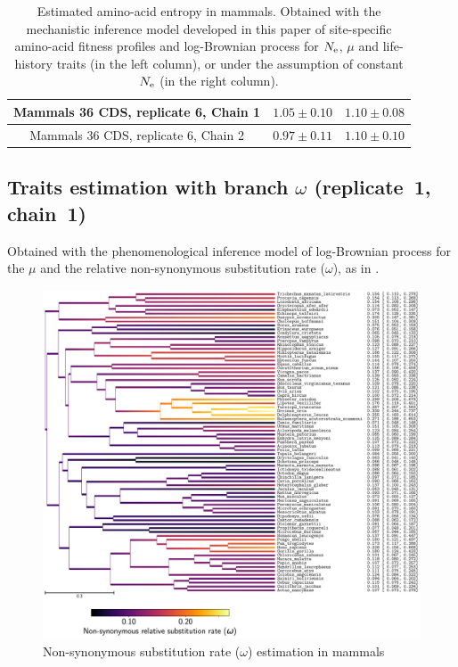 \documentclass{article}
\begin{document}
\begin{table}[H]
{\begin{tabu}{|c|c|c|}
			Mammals 36 {CDS}, replicate 6, Chain 1 & $1.05 \pm 0.10$ & $1.10 \pm 0.08$\\ \hline
			Mammals 36 {CDS}, replicate 6, Chain 2 & $0.97 \pm 0.11$ & $1.10 \pm 0.10$\\ \hline
		\end{tabu}}
		\caption[Entropy of amino acids in mammals]{Estimated amino-acid entropy in mammals.
		Obtained with the mechanistic inference model developed in this paper of site-specific amino-acid fitness profiles and log-Brownian process for $N_{\text{e}}$, $\mu$ and life-history traits (in the left column), or under the assumption of constant $N_{\text{e}}$ (in the right column).}
		\label{tab:table-entropy-aa-mutselne}
	\end{table}

	\subsection{Traits estimation with branch \texorpdfstring{$\omega$}{ω} (replicate~1, chain~1)}
	Obtained with the phenomenological inference model of log-Brownian process for the $\mu$ and the relative {non-synonymous} {substitution} rate ($\omega$), as in \citet{Lartillot2011}.

	\begin{figure}[H]
		\centering
		\includegraphics[width=\linewidth, page=1]{mammals/18CDS_BranchOmega_R1_LogdNdS}
		\caption[$\omega$ estimation in mammals]{{Non-synonymous substitution} rate ($\omega$) estimation in mammals}
	\end{figure}
\end{document}
